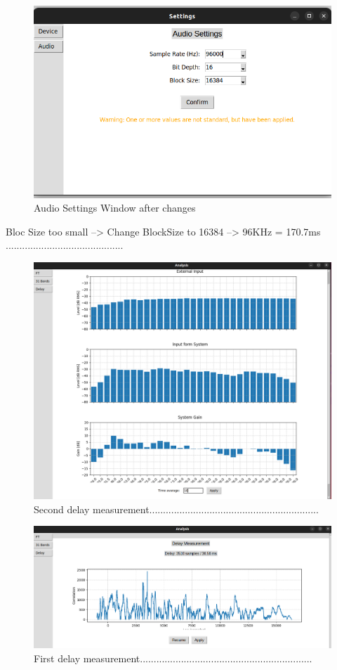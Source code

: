 \begin{figure}[H]
	\centering
	\includegraphics[width=0.6
	\linewidth]{Figures/Coro_audio_settings.png}
	\caption{Audio Settings Window after changes}
	\label{fig:Coro_audio_settings}
\end{figure}

Bloc Size too small --> Change BlockSize to 16384 --> 96KHz = 170.7ms ...........................................

\begin{figure}[H]
	\centering
	\includegraphics[width=0.6
	\linewidth]{Figures/Coro_Pink_Good.png}
	\caption{Second delay measurement..............................................................}
	\label{fig:Coro_Good_Pink}
\end{figure}

\begin{figure}[H]
	\centering
	\includegraphics[width=0.6
	\linewidth]{Figures/Coro_Delay.png}
	\caption{First delay measurement...............................................................}
	\label{fig:Coro_delay1}
\end{figure}

